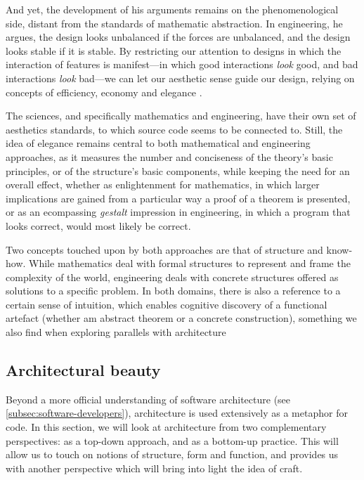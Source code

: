And yet, the development of his arguments remains on the phenomenological side, distant from the standards of mathematic abstraction. In engineering, he argues, the design looks unbalanced if the forces are unbalanced, and the design looks stable if it is stable.  By restricting our attention to designs in which the interaction of features is manifest—in which good interactions \emph{look} good, and bad interactions \emph{look} bad—we can let our aesthetic sense guide our design, relying on concepts of efficiency, economy and elegance \citep{mclennan_who_1997}.

The sciences, and specifically mathematics and engineering, have their own set of aesthetics standards, to which source code seems to be connected to. Still, the idea of elegance remains central to both mathematical and engineering approaches, as it measures the number and conciseness of the theory's basic principles, or of the structure's basic components, while keeping the need for an overall effect, whether as enlightenment for mathematics, in which larger implications are gained from a particular way a proof of a theorem is presented, or as an ecompassing \emph{gestalt} impression in engineering, in which a program that looks correct, would most likely be correct.

Two concepts touched upon by both approaches are that of structure and know-how. While mathematics deal with formal structures to represent and frame the complexity of the world, engineering deals with concrete structures offered as solutions to a specific problem. In both domains, there is also a reference to a certain sense of intuition, which enables cognitive discovery of a functional artefact (whether am abstract theorem or a concrete construction), something we also find when exploring parallels with architecture

\subsection{Architectural beauty}
\label{subsec:beauty-architecture}

Beyond a more official understanding of software architecture (see \ref{subsec:software-developers}), architecture is used extensively as a metaphor for code. In this section, we will look at architecture from two complementary perspectives: as a top-down approach, and as a bottom-up practice. This will allow us to touch on notions of structure, form and function, and provides us with another perspective which will bring into light the idea of craft.

